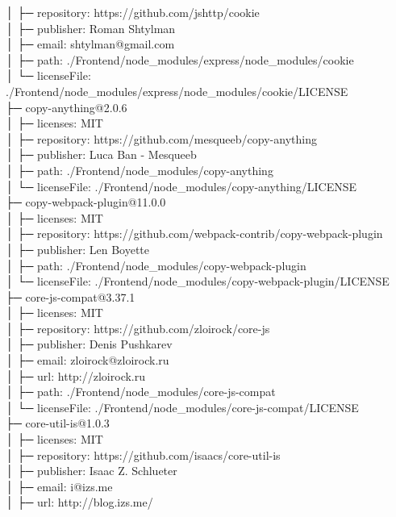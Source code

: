 │  ├─ repository: https://github.com/jshttp/cookie\\
│  ├─ publisher: Roman Shtylman\\
│  ├─ email: shtylman@gmail.com\\
│  ├─ path: ./Frontend/node\_modules/express/node\_modules/cookie\\
│  └─ licenseFile: ./Frontend/node\_modules/express/node\_modules/cookie/LICENSE\\
├─ copy-anything@2.0.6\\
│  ├─ licenses: MIT\\
│  ├─ repository: https://github.com/mesqueeb/copy-anything\\
│  ├─ publisher: Luca Ban - Mesqueeb\\
│  ├─ path: ./Frontend/node\_modules/copy-anything\\
│  └─ licenseFile: ./Frontend/node\_modules/copy-anything/LICENSE\\
├─ copy-webpack-plugin@11.0.0\\
│  ├─ licenses: MIT\\
│  ├─ repository: https://github.com/webpack-contrib/copy-webpack-plugin\\
│  ├─ publisher: Len Boyette\\
│  ├─ path: ./Frontend/node\_modules/copy-webpack-plugin\\
│  └─ licenseFile: ./Frontend/node\_modules/copy-webpack-plugin/LICENSE\\
├─ core-js-compat@3.37.1\\
│  ├─ licenses: MIT\\
│  ├─ repository: https://github.com/zloirock/core-js\\
│  ├─ publisher: Denis Pushkarev\\
│  ├─ email: zloirock@zloirock.ru\\
│  ├─ url: http://zloirock.ru\\
│  ├─ path: ./Frontend/node\_modules/core-js-compat\\
│  └─ licenseFile: ./Frontend/node\_modules/core-js-compat/LICENSE\\
├─ core-util-is@1.0.3\\
│  ├─ licenses: MIT\\
│  ├─ repository: https://github.com/isaacs/core-util-is\\
│  ├─ publisher: Isaac Z. Schlueter\\
│  ├─ email: i@izs.me\\
│  ├─ url: http://blog.izs.me/\\
